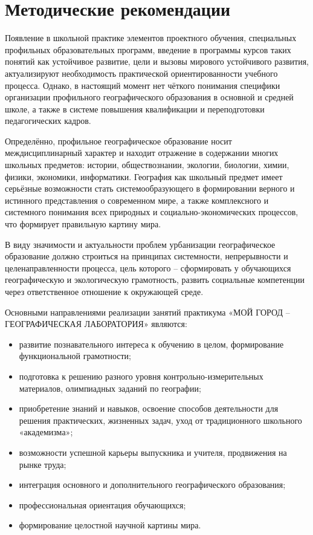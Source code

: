\documentclass[
  11pt,
]{book}
\begin{document}
\section*{Методические рекомендации}\label{ux43cux435ux442ux43eux434ux438ux447ux435ux441ux43aux438ux435-ux440ux435ux43aux43eux43cux435ux43dux434ux430ux446ux438ux438}

Появление в школьной практике элементов проектного обучения, специальных профильных образовательных программ, введение в программы курсов таких понятий как устойчивое развитие, цели и вызовы мирового устойчивого развития, актуализируют необходимость практической ориентированности учебного процесса. Однако, в настоящий момент нет чёткого понимания специфики организации профильного географического образования в основной и средней школе, а также в системе повышения квалификации и переподготовки педагогических кадров.

Определённо, профильное географическое образование носит междисциплинарный характер и находит отражение в содержании многих школьных предметов: истории, обществознании, экологии, биологии, химии, физики, экономики, информатики. География как школьный предмет имеет серьёзные возможности стать системообразующего в формировании верного и истинного представления о современном мире, а также комплексного и системного понимания всех природных и социально-экономических процессов, что формирует правильную картину мира.

В виду значимости и актуальности проблем урбанизации географическое образование должно строиться на принципах системности, непрерывности и целенаправленности процесса, цель которого -- сформировать у обучающихся географическую и экологическую грамотность, развить социальные компетенции через ответственное отношение к окружающей среде.

Основными направлениями реализации занятий практикума «МОЙ ГОРОД -- ГЕОГРАФИЧЕСКАЯ ЛАБОРАТОРИЯ» являются:

\begin{itemize}
\item
  развитие познавательного интереса к обучению в целом, формирование функциональной грамотности;
\item
  подготовка к решению разного уровня контрольно-измерительных материалов, олимпиадных заданий по географии;
\item
  приобретение знаний и навыков, освоение способов деятельности для решения практических, жизненных задач, уход от традиционного школьного «академизма»;
\item
  возможности успешной карьеры выпускника и учителя, продвижения на рынке труда;
\item
  интеграция основного и дополнительного географического образования;
\item
  профессиональная ориентация обучающихся;
\item
  формирование целостной научной картины мира.
\end{itemize}
\end{document}
